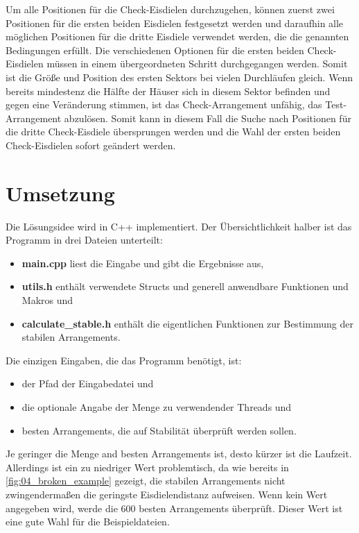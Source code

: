 \documentclass[a4paper,10pt,ngerman,captions=figureheading]{scrartcl}
\begin{document}
\medskip
Um alle Positionen für die Check-Eisdielen durchzugehen, können zuerst zwei Positionen für die ersten beiden Eisdielen festgesetzt werden und daraufhin alle möglichen Positionen für die dritte Eisdiele verwendet werden, die die genannten Bedingungen erfüllt.
Die verschiedenen Optionen für die ersten beiden Check-Eisdielen müssen in einem übergeordneten Schritt durchgegangen werden.
Somit ist die Größe und Position des ersten Sektors bei vielen Durchläufen gleich.
Wenn bereits mindestenz die Hälfte der Häuser sich in diesem Sektor befinden und gegen eine Veränderung stimmen, ist das Check-Arrangement unfähig, das Test-Arrangement abzulösen.
Somit kann in diesem Fall die Suche nach Positionen für die dritte Check-Eisdiele übersprungen werden und die Wahl der ersten beiden Check-Eisdielen sofort geändert werden.

\section{Umsetzung}
Die Lösungsidee wird in C++ implementiert.
Der Übersichtlichkeit halber ist das Programm in drei Dateien unterteilt:
\begin{itemize}
    \item \textbf{main.cpp} liest die Eingabe und gibt die Ergebnisse aus,
    \item \textbf{utils.h} enthält verwendete Structs und generell anwendbare Funktionen und Makros und
    \item \textbf{calculate\_stable.h} enthält die eigentlichen Funktionen zur Bestimmung der stabilen Arrangements.
\end{itemize}
Die einzigen Eingaben, die das Programm benötigt, ist:
\begin{itemize}
    \item der Pfad der Eingabedatei und
    \item die optionale Angabe der Menge zu verwendender Threads und
    \item besten Arrangements, die auf Stabilität überprüft werden sollen.
\end{itemize}

Je geringer die Menge and besten Arrangements ist, desto kürzer ist die Laufzeit.
Allerdings ist ein zu niedriger Wert problemtisch, da wie bereits in \autoref{fig:04_broken_example} gezeigt, die stabilen Arrangements nicht zwingendermaßen die geringste Eisdielendistanz aufweisen.
Wenn kein Wert angegeben wird, werde die $600$ besten Arrangements überprüft.
Dieser Wert ist eine gute Wahl für die Beispieldateien.
\end{document}
